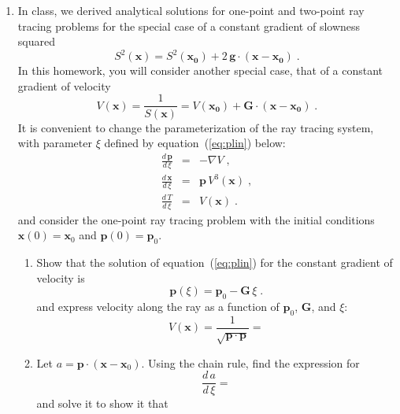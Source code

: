 \begin{enumerate}

\item In class, we derived analytical solutions for one-point and
two-point ray tracing problems for the special case of a constant
gradient of slowness squared 
\begin{equation}
  \label{eq:s2}
  S^2(\mathbf{x}) =
  S^2(\mathbf{x_0})+2\,\mathbf{g} \cdot (\mathbf{x}-\mathbf{x_0})\;.
\end{equation}
In this homework, you will consider another special case, that of a
constant gradient of velocity
\begin{equation}
  V(\mathbf{x}) = {\frac{1}{S(\mathbf{x})}} =
  {V(\mathbf{x_0})+\mathbf{G} \cdot (\mathbf{x}-\mathbf{x_0})}\;.
  \label{eq:v}
\end{equation}
It is convenient to change the parameterization of the ray tracing
system, with parameter $\xi$ defined by equation~(\ref{eq:plin}) below:
\begin{eqnarray}
  \label{eq:plin}
  \frac{d\,\mathbf{p}}{d\,\xi} & = & -\nabla V\;, \\
  \label{eq:xlin}
  \frac{d\,\mathbf{x}}{d\,\xi} & = &
  \mathbf{p}\,V^3(\mathbf{x})\;, \\
  \label{eq:tlin}
  \frac{d\,T}{d\,\xi} & = & V(\mathbf{x})\;.
\end{eqnarray}
and consider the one-point ray tracing problem with the initial conditions
$\mathbf{x}(0)= \mathbf{x}_0$ and $\mathbf{p}(0)=\mathbf{p}_0$.
\begin{enumerate}
\item  Show that the solution of
equation~(\ref{eq:plin}) for the constant gradient of velocity is
\begin{equation}
  \label{eq:pcir}
  \mathbf{p}(\xi) =  \mathbf{p}_0 - \mathbf{G}\,\xi\;.
\end{equation}
and express velocity along the ray as a function of
  $\mathbf{p}_0$, $\mathbf{G}$, and $\xi$:
  \begin{equation}
\label{eq:vsol}
V(\mathbf{x}) = \frac{1}{\sqrt{\mathbf{p} \cdot \mathbf{p}}} = 
\end{equation}
\item Let $a = \mathbf{p} \cdot (\mathbf{x} - \mathbf{x}_0)$. Using
  the chain rule, find the expression for
  \begin{equation}
    \frac{d\,a}{d\,\xi} = 
  \end{equation}
  and solve it to show it that 
  \begin{equation}

\end{equation}
\end{enumerate}
\end{enumerate}
